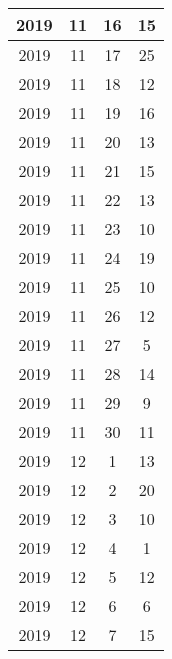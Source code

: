 \begin{longtable} {|c|c|c|c|}
\hline
2019         & 11           & 16           & 15                        \\ 
\hline
2019         & 11           & 17           & 25                        \\ 
\hline
2019         & 11           & 18           & 12                        \\ 
\hline
2019         & 11           & 19           & 16                        \\ 
\hline
2019         & 11           & 20           & 13                        \\ 
\hline
2019         & 11           & 21           & 15                        \\ 
\hline
2019         & 11           & 22           & 13                        \\ 
\hline
2019         & 11           & 23           & 10                        \\ 
\hline
2019         & 11           & 24           & 19                        \\ 
\hline
2019         & 11           & 25           & 10                        \\ 
\hline
2019         & 11           & 26           & 12                        \\ 
\hline
2019         & 11           & 27           & 5                         \\ 
\hline
2019         & 11           & 28           & 14                        \\ 
\hline
2019         & 11           & 29           & 9                         \\ 
\hline
2019         & 11           & 30           & 11                        \\ 
\hline
2019         & 12           & 1            & 13                        \\ 
\hline
2019         & 12           & 2            & 20                        \\ 
\hline
2019         & 12           & 3            & 10                        \\ 
\hline
2019         & 12           & 4            & 1                         \\ 
\hline
2019         & 12           & 5            & 12                        \\ 
\hline
2019         & 12           & 6            & 6                         \\ 
\hline
2019         & 12           & 7            & 15                        \\ 

\end{longtable}
